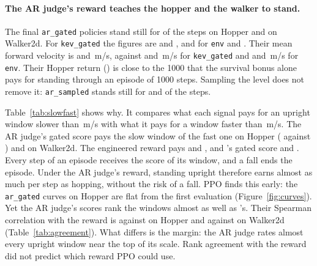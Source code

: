 \begin{table}[t]
\centering\small

\caption{What each signal pays for standing relative to running, on the windows of \S\ref{sec:agreement} (logged by the
\texttt{env} runs). The table gives the mean over the windows without a fall that are slower than \,m/s,
divided by the mean over those faster than \,m/s. \emph{env.\ reward}: the per-step environment reward.}
\label{tab:slowfast}
\end{table}

\paragraph{The AR judge's reward teaches the hopper and the walker to stand.} The final \texttt{ar\_gated} policies stand
still for  of the steps on Hopper and  on Walker2d. For
\texttt{kev\_gated} the figures are  and , and for \texttt{env}
 and . Their mean forward velocity is  and
\,m/s, against  and \,m/s for
\texttt{kev\_gated} and  and \,m/s for \texttt{env}. Their Hopper return
() is close to the 1000 that the survival bonus alone pays for standing through an episode of
1000 steps. Sampling the level does not remove it: \texttt{ar\_sampled} stands still for 
and  of the steps.

Table~\ref{tab:slowfast} shows why. It compares what each signal pays for an upright window slower than
\,m/s with what it pays for a window faster than \,m/s. The AR judge's gated score pays
the slow window  of the fast one on Hopper ( against
) and  on Walker2d. The engineered reward pays
 and , and \kev{}'s gated score  and
. Every step of an episode receives the score of its window, and a fall ends the episode.
Under the AR judge's reward, standing upright therefore earns almost as much per step as hopping, without the risk of a
fall. PPO finds this early: the \texttt{ar\_gated} curves on Hopper are flat from the first evaluation
(Figure~\ref{fig:curves}). Yet the AR judge's scores rank the windows almost as well as \kev{}'s. Their Spearman
correlation with the reward is  against  on Hopper and
 against  on Walker2d (Table~\ref{tab:agreement}). What differs is the
margin: the AR judge rates almost every upright window near the top of its scale. Rank agreement with the reward did not
predict which reward PPO could use.

